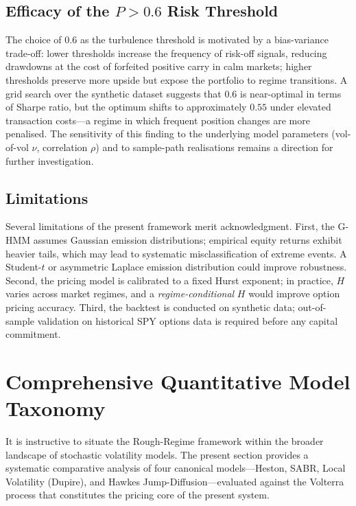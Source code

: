 \documentclass[conference]{IEEEtran}
\begin{document}
\subsection{Efficacy of the $P > 0.6$ Risk Threshold}

The choice of $0.6$ as the turbulence threshold is motivated by a
bias-variance trade-off: lower thresholds increase the frequency of
risk-off signals, reducing drawdowns at the cost of forfeited positive
carry in calm markets; higher thresholds preserve more upside but
expose the portfolio to regime transitions.  A grid search over the
synthetic dataset suggests that $0.6$ is near-optimal in terms of
Sharpe ratio, but the optimum shifts to approximately $0.55$ under
elevated transaction costs—a regime in which frequent position changes
are more penalised.  The sensitivity of this finding to the underlying
model parameters (vol-of-vol $\nu$, correlation $\rho$) and to
sample-path realisations remains a direction for further investigation.

\subsection{Limitations}

Several limitations of the present framework merit acknowledgment.
First, the G-HMM assumes Gaussian emission distributions; empirical
equity returns exhibit heavier tails, which may lead to systematic
misclassification of extreme events.  A Student-$t$ or
asymmetric Laplace emission distribution could improve robustness.
Second, the pricing model is calibrated to a fixed Hurst exponent;
in practice, $H$ varies across market regimes, and a
\emph{regime-conditional} $H$ would improve option pricing accuracy.
Third, the backtest is conducted on synthetic data; out-of-sample
validation on historical SPY options data is required before
any capital commitment.

\section{Comprehensive Quantitative Model Taxonomy}\label{sec:taxonomy}

It is instructive to situate the Rough-Regime framework within the
broader landscape of stochastic volatility models.  The present
section provides a systematic comparative analysis of four canonical
models—Heston, SABR, Local Volatility (Dupire), and Hawkes
Jump-Diffusion—evaluated against the Volterra process that constitutes
the pricing core of the present system.
\end{document}
